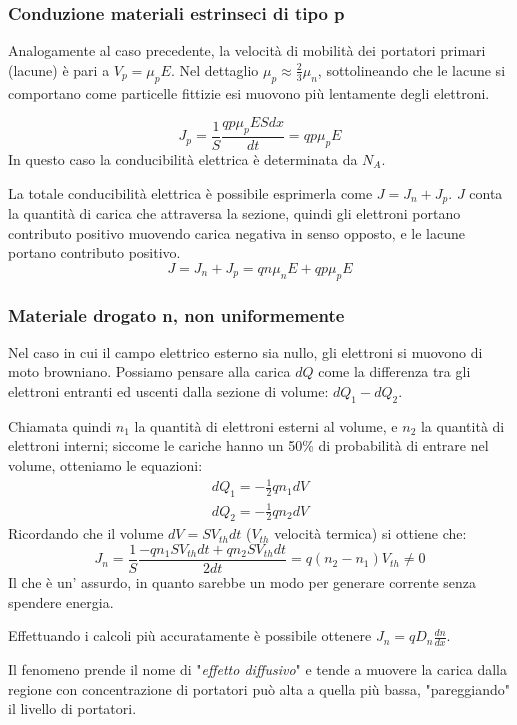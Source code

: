 \documentclass[../template]{subfiles}
\begin{document}
\subsubsection{Conduzione materiali estrinseci di tipo p}
Analogamente al caso precedente, la velocità di mobilità dei portatori primari (lacune) è pari a $V_p = \mu_p E$.
Nel dettaglio $\mu_p \approx \frac{2}{3} \mu_n$, sottolineando che le lacune si comportano come particelle fittizie esi muovono più lentamente degli elettroni.

\[
    J_p = \frac{1}{S}\frac{qp\mu_pESdx}{dt} = qp\mu_p E
\]
In questo caso la conducibilità elettrica è determinata da $N_A$.

La totale conducibilità elettrica è possibile esprimerla come $J = J_n + J_p$. $J$ conta la quantità di carica che attraversa la sezione, quindi gli elettroni portano contributo positivo muovendo carica negativa in senso opposto, e le lacune portano contributo positivo.
\[
    J = J_n + J_p = qn\mu_n E + qp \mu_p E
\]
\subsubsection{Materiale drogato n, non uniformemente}

Nel caso in cui il campo elettrico esterno sia nullo, gli elettroni si muovono di moto browniano.
Possiamo pensare alla carica $dQ$ come la differenza tra gli elettroni entranti ed uscenti dalla sezione di volume: $dQ_1 - dQ_2$.

Chiamata quindi $n_1$ la quantità di elettroni esterni al volume, e $n_2$ la quantità di elettroni interni; siccome le cariche hanno un 50\% di probabilità di entrare nel volume, otteniamo le equazioni:
\begin{align*}
    dQ_1 = -\frac{1}{2}q n_1 dV\\
    dQ_2 = -\frac{1}{2}q n_2 dV
\end{align*}
Ricordando che il volume $dV = S V_{th} dt$ ($V_{th}$ velocità termica) si ottiene che:
\[
    J_n = \frac{1}{S} \frac{-qn_1 S V_{th} dt + qn_2 S V_{th} dt}{2dt}  = q(n_2 - n_1) V_{th} \neq 0
\]
Il che è un' assurdo, in quanto sarebbe un modo per generare corrente senza spendere energia.

Effettuando i calcoli più accuratamente è possibile ottenere $J_n = q D_n \frac{dn}{dx}$.

Il fenomeno prende il nome di "\textit{effetto diffusivo}" e tende a muovere la carica dalla regione con concentrazione
di portatori può alta a quella più bassa, "pareggiando" il livello di portatori.
\end{document}
